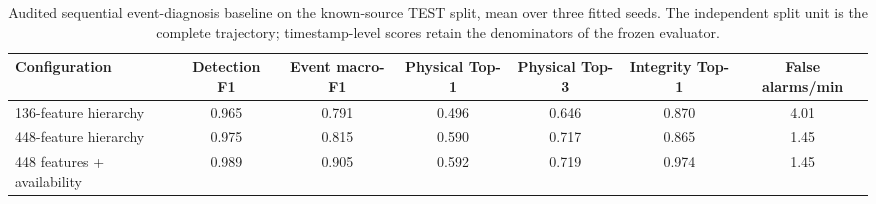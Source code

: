 \begin{table}[t]
\caption{Audited sequential event-diagnosis baseline on the known-source TEST split, mean over three fitted seeds. The independent split unit is the complete trajectory; timestamp-level scores retain the denominators of the frozen evaluator.}
\label{tab:legacy-event-results}
\centering
\footnotesize
\begin{tabular}{lcccccc}
\toprule
Configuration & Detection F1 & Event macro-F1 & Physical Top-1 & Physical Top-3 & Integrity Top-1 & False alarms/min \\
\midrule
136-feature hierarchy & 0.965 & 0.791 & 0.496 & 0.646 & 0.870 & 4.01 \\
448-feature hierarchy & 0.975 & 0.815 & 0.590 & 0.717 & 0.865 & 1.45 \\
448 features + availability & 0.989 & 0.905 & 0.592 & 0.719 & 0.974 & 1.45 \\
\bottomrule
\end{tabular}
\end{table}
